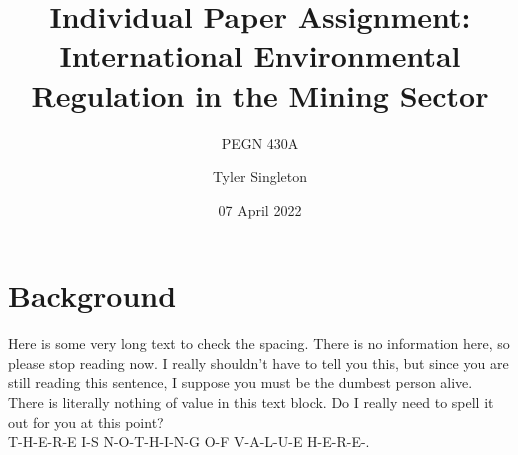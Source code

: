 \documentclass[12pt]{article}
\title{Individual Paper Assignment: \\
    International Environmental Regulation in the Mining Sector}
\subtitle{PEGN 430A}
\author{Tyler Singleton}
\date{07 April 2022}
\begin{document}
\maketitle
\newpage



\doublespacing
\section{Background}

 Here is some very long text to check the spacing. There is no information here, so please stop reading now. I really shouldn't have to tell you this, but since you are still reading this sentence, I suppose you must be the dumbest person alive. There is literally nothing of value in this text block. Do I really need to spell it out for you at this point? \\

T-H-E-R-E I-S N-O-T-H-I-N-G O-F V-A-L-U-E H-E-R-E-. 


\newpage
\printbibliography
\end{document}
